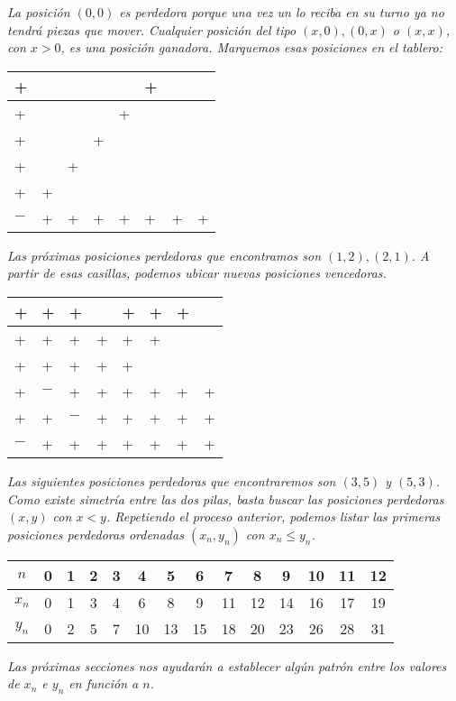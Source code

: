 \textit{La posici\'on $(0,0)$ es perdedora porque una vez un lo reciba en su turno ya no tendr\'a piezas que mover. Cualquier posici\'on del tipo $(x,0),(0,x)$ o $(x,x)$, con $x>0$, es una posici\'on ganadora. Marquemos esas posiciones en el tablero:}
	\begin{center}
	\begin{tabular}{|p{0.01in}| p{0.01in}| p{0.01in}|p{0.01in}| p{0.01in}| p{0.01in}|p{0.01in}| p{0.01in}| } 
	\hline
	+ &  &  &  &  & + &  &  \\[0.5ex]
	\hline
	+ &  &  &  & + &  &  &  \\[0.5ex]
	\hline
	+&  &  & + &  &  &  &  \\[0.5ex]
	\hline
	+ &  & + &  &  &  &  &  \\[0.5ex]
	\hline
	+ & + &  &  &  &  &  &  \\[0.5ex]
	\hline
	$-$ & + & + & + & + & + & + & + \\[0.5ex]
	\hline
    \end{tabular}
	\end{center}

	\textit{Las pr\'oximas posiciones perdedoras que encontramos son $(1,2),(2,1)$. A partir de esas casillas, podemos ubicar nuevas posiciones vencedoras.} 
	
	\begin{center}
		\begin{tabular}{|p{0.01in}| p{0.01in}| p{0.01in}|p{0.01in}| p{0.01in}| p{0.01in}|p{0.01in}| p{0.01in}| } 
			\hline
			+ & + & + &  & + & + & + &  \\[0.5ex]
			\hline
			+ & + & + & + & + & + &  &  \\[0.5ex]
			\hline
			+ & + & + & + & + &  &  &  \\[0.5ex]
			\hline
			+ & $-$ & + & + & + & + & + & + \\[0.5ex]
			\hline
			+ & + & $-$ & + & + & + & + & + \\[0.5ex]
			\hline
			$-$ & + & + & + & + & + & + & + \\[0.5ex]
			\hline
		\end{tabular}
	\end{center}

\textit{Las siguientes posiciones perdedoras que encontraremos son $(3,5)$ y $(5,3)$. Como existe simetr\'ia entre las dos pilas, basta buscar las posiciones perdedoras $(x,y)$ con $x<y$. Repetiendo el proceso anterior, podemos listar las primeras posiciones perdedoras ordenadas $(x_{n},y_{n})$	con $x_{n}\leq y_{n}$.}

\begin{center}
	\begin{tabular}{|c|c|c|c|c|c|c|c|c|c|c|c|c|c|} 
		\hline
		$n$ & 0 & 1 & 2 & 3 & 4 & 5 & 6 & 7 & 8 & 9 & 10 & 11 & 12 \\
		\hline
		$x_{n}$ & 0 & 1 & 3 & 4 & 6 & 8 & 9 & 11 & 12 & 14 & 16 & 17 & 19 \\
		\hline
		$y_{n}$ & 0 & 2 & 5 & 7 & 10 & 13 & 15 & 18 & 20 & 23 & 26 & 28 & 31 \\
		\hline
	\end{tabular}
\end{center}

\textit{Las pr\'oximas secciones nos ayudar\'an a establecer alg\'un patr\'on entre los valores de $x_{n}$ e $y_{n}$ en funci\'on a $n$.}